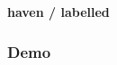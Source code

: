 \documentclass[aspectratio=1610]{beamer}
\begin{document}
\invert
\begin{frame}
   \LARGE \textbf{haven / labelled}
   \par
\end{frame}
\revert

\begin{frame}
  \frametitle{Demo}
\end{frame}


%




\begin{frame}[plain]
\end{frame}
\end{document}
